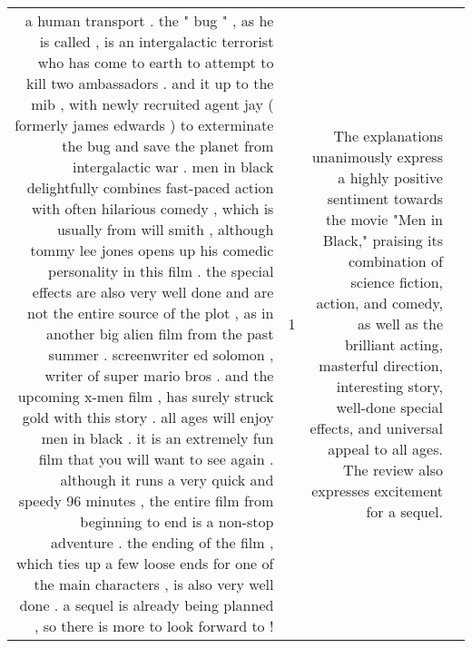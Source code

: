 \begin{tabular}{r{1cm} p{0.4in} r{1cm} p{0.4in}}
a human transport .  the " bug " , as he is called , is an intergalactic terrorist who has come to earth to attempt to kill two ambassadors .  and it up to the mib , with newly recruited agent jay ( formerly james edwards ) to exterminate the bug and save the planet from intergalactic war .  men in black delightfully combines fast-paced action with often hilarious comedy , which is usually from will smith , although tommy lee jones opens up his comedic personality in this film .  the special effects are also very well done and are not the entire source of the plot , as in another big alien film from the past summer .  screenwriter ed solomon , writer of super mario bros .  and the upcoming x-men film , has surely struck gold with this story .  all ages will enjoy men in black .  it is an extremely fun film that you will want to see again .  although it runs a very quick and speedy 96 minutes , the entire film from beginning to end is a non-stop adventure .  the ending of the film , which ties up a few loose ends for one of the main characters , is also very well done .  a sequel is already being planned , so there is more to look forward to !   & 1 & The explanations unanimously express a highly positive sentiment towards the movie "Men in Black," praising its combination of science fiction, action, and comedy, as well as the brilliant acting, masterful direction, interesting story, well-done special effects, and universal appeal to all ages. The review also expresses excitement for a sequel. \\

\end{tabular}
